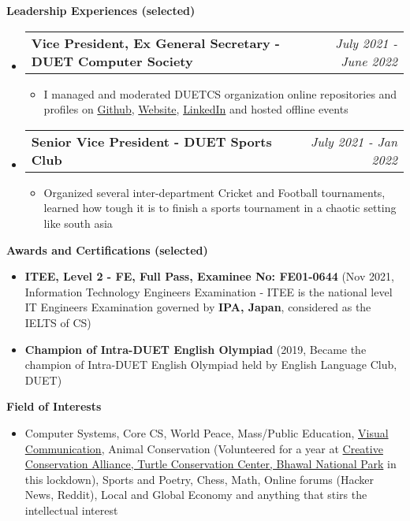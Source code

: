 \documentclass[legalpaper,10pt]{article}
\makeatletter
\newcommand{\resheading}[1]{{\large \colorbox{mygrey}{\begin{minipage}{\textwidth}{\textbf{#1 \vphantom{p\^{E}}}}\end{minipage}}}}
\newcommand{\ressubheading}[4]{
	\begin{tabular*}{7.1in}{l@{\extracolsep{\fill}}r}
		\textbf{#1} & \textit{#4} \\
	\end{tabular*}\vspace{-6pt}}
\makeatother
\begin{document}
	\vspace{0.20in}
	
	\resheading{Leadership Experiences (selected)}
	\begin{itemize}
		\item \ressubheading{Vice President, Ex General Secretary - DUET Computer Society}{}{}{July 2021 - June 2022}
		\begin{itemize}
		    \item I managed and moderated DUETCS organization online repositories and profiles on \href{https://github.com/duetcs}{Github}, \href{https://duetcs.github.io}{Website}, \href{https://www.linkedin.com/company/duet-computer-society}{LinkedIn} and hosted offline events
		\end{itemize}
		
		\item \ressubheading{Senior Vice President - DUET Sports Club}{}{}{July 2021 - Jan 2022}
		\begin{itemize}
		    \item Organized several inter-department Cricket and Football tournaments, learned how tough it is to finish a sports tournament in a chaotic setting like south asia
		\end{itemize}
		
	\end{itemize}

	\vspace{0.20in}
	
	\resheading{Awards and Certifications (selected)}
	\begin{itemize}
	
		\item \textbf{ITEE, Level 2 - FE, Full Pass, Examinee No: FE01-0644} (Nov 2021,  Information Technology Engineers Examination - ITEE is the national level IT Engineers Examination governed by \textbf{IPA, Japan}, considered as the IELTS of CS) 
		
		\item \textbf{Champion of Intra-DUET English Olympiad} (2019, Became the champion of Intra-DUET English Olympiad held by English Language Club, DUET)

	\end{itemize}

	\vspace{0.20in}
	
	\resheading{Field of Interests}
		\begin{itemize}
			\item Computer Systems, Core CS,  World Peace, Mass/Public Education, \href{https://www.instagram.com/obepari/}{Visual Communication}, Animal Conservation (Volunteered for a year at \url{} \href{https://www.instagram.com/creativeconservationalliance/}{Creative Conservation Alliance, Turtle Conservation Center, Bhawal National Park} in this lockdown), Sports and Poetry, Chess, Math, Online forums (Hacker News, Reddit), Local and Global Economy and anything that stirs the intellectual interest
		\end{itemize}
\end{document}
